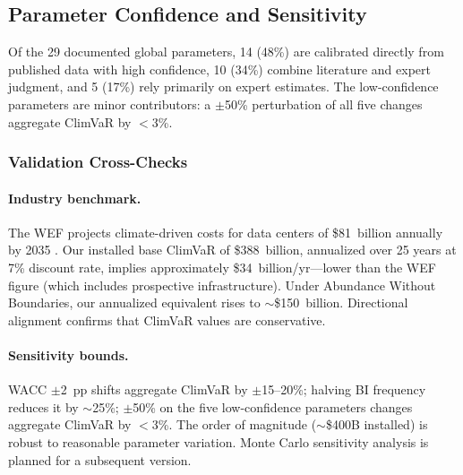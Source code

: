\subsection{Parameter Confidence and Sensitivity}
\label{app:confidence}

Of the 29 documented global parameters, 14 (48\%) are calibrated directly from published
data with high confidence, 10 (34\%) combine literature and expert judgment, and 5 (17\%)
rely primarily on expert estimates. The low-confidence parameters are minor contributors:
a $\pm$50\% perturbation of all five changes aggregate ClimVaR by $<$3\%.

\subsubsection{Validation Cross-Checks}

\paragraph{Industry benchmark.} The WEF projects climate-driven costs for data centers of
\$81~billion annually by 2035 \citep{wef2025}. Our installed base ClimVaR of \$388~billion,
annualized over 25 years at 7\% discount rate, implies approximately \$34~billion/yr---lower
than the WEF figure (which includes prospective infrastructure). Under Abundance Without
Boundaries, our annualized equivalent rises to $\sim$\$150~billion. Directional alignment
confirms that ClimVaR values are conservative.

\paragraph{Sensitivity bounds.} WACC $\pm$2~pp shifts aggregate ClimVaR by $\pm$15--20\%;
halving BI frequency reduces it by $\sim$25\%; $\pm$50\% on the five low-confidence
parameters changes aggregate ClimVaR by $<$3\%. The order of magnitude ($\sim$\$400B
installed) is robust to reasonable parameter variation. Monte Carlo sensitivity analysis
is planned for a subsequent version.